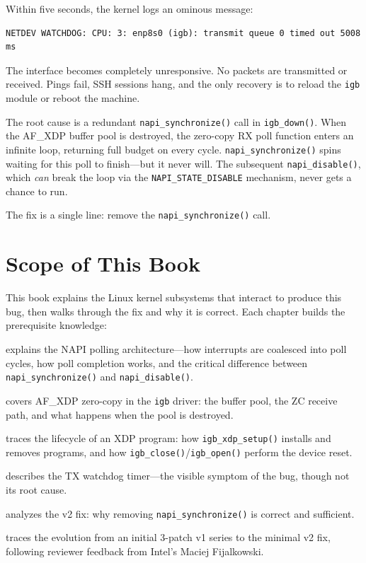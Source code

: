 \documentclass[11pt,a4paper,openany]{book}
\newcommand{\func}[1]{\texttt{#1()}}
\newcommand{\flag}[1]{\texttt{#1}}
\begin{document}
Within five seconds, the kernel logs an ominous message:

\begin{lstlisting}[style=shellstyle]
NETDEV WATCHDOG: CPU: 3: enp8s0 (igb): transmit queue 0 timed out 5008 ms
\end{lstlisting}

The interface becomes completely unresponsive.  No packets are
transmitted or received.  Pings fail, SSH sessions hang, and the only
recovery is to reload the \texttt{igb} module or reboot the machine.

The root cause is a redundant \func{napi\_synchronize} call in
\func{igb\_down}.  When the AF\_XDP buffer pool is destroyed, the
zero-copy RX poll function enters an infinite loop, returning full
budget on every cycle.  \func{napi\_synchronize} spins waiting for
this poll to finish---but it never will.  The subsequent
\func{napi\_disable}, which \emph{can} break the loop via the
\flag{NAPI\_STATE\_DISABLE} mechanism, never gets a chance to run.

The fix is a single line: remove the \func{napi\_synchronize} call.

\section{Scope of This Book}

This book explains the Linux kernel subsystems that interact to produce
this bug, then walks through the fix and why it is correct.  Each
chapter builds the prerequisite knowledge:

\begin{description}[style=nextline]
\item[Chapter~\ref{ch:napi}] explains the NAPI polling architecture---how
    interrupts are coalesced into poll cycles, how poll completion works,
    and the critical difference between \func{napi\_synchronize} and
    \func{napi\_disable}.
\item[Chapter~\ref{ch:afxdp}] covers AF\_XDP zero-copy in the \texttt{igb}
    driver: the buffer pool, the ZC receive path, and what happens when
    the pool is destroyed.
\item[Chapter~\ref{ch:xdp-lifecycle}] traces the lifecycle of an XDP
    program: how \func{igb\_xdp\_setup} installs and removes programs, and
    how \func{igb\_close}/\func{igb\_open} perform the device reset.
\item[Chapter~\ref{ch:watchdog}] describes the TX watchdog timer---the
    visible symptom of the bug, though not its root cause.
\item[Chapter~\ref{ch:fix}] analyzes the v2 fix: why removing
    \func{napi\_synchronize} is correct and sufficient.
\item[Chapter~\ref{ch:evolution}] traces the evolution from an initial
    3-patch v1 series to the minimal v2 fix, following reviewer feedback
    from Intel's Maciej Fijalkowski.
\end{description}
\end{document}
